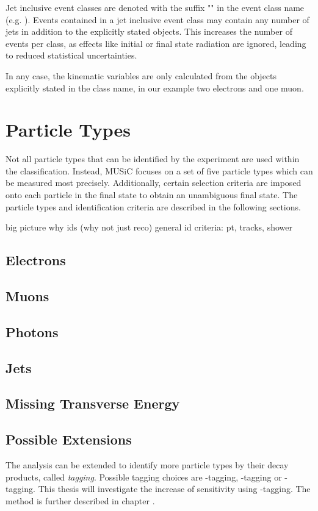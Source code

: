 Jet inclusive event classes are denoted with the suffix "" in the event class name (e.g. ). Events contained in a jet inclusive event class may contain any number of jets in addition to the explicitly stated objects. This increases the number of events per class, as effects like initial or final state radiation are ignored, leading to reduced statistical uncertainties.

In any case, the kinematic variables are only calculated from the objects explicitly stated in the class name, in our example two electrons and one muon.


\section{Particle Types}
Not all particle types that can be identified by the experiment are used within the classification. Instead, \ac{MUSiC} focuses on a set of five particle types which can be measured most precisely.
Additionally, certain selection criteria are imposed onto each particle in the final state to obtain an unambiguous final state.
The particle types and identification criteria are described in the following sections.

big picture
why ids (why not just reco)
general id criteria: pt, tracks, shower


\subsection{Electrons}



\subsection{Muons}

\subsection{Photons}

\subsection{Jets}

\subsection{Missing Transverse Energy}

\subsection{Possible Extensions}
The analysis can be extended to identify more particle types by their decay products, called \emph{tagging}. Possible tagging choices are \Pqb-tagging, \Ptau-tagging or \PZ-tagging.
This thesis will investigate the increase of sensitivity using \Pqb-tagging. The method is further described in chapter .

